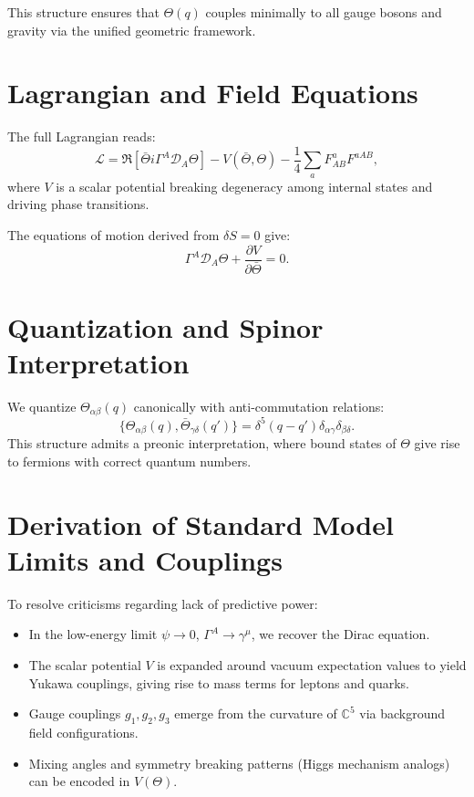 \documentclass[12pt]{article}
\begin{document}
This structure ensures that \( \Theta(q) \) couples minimally to all gauge bosons and gravity via the unified geometric framework.

\section{Lagrangian and Field Equations}
The full Lagrangian reads:
\[
\mathcal{L} = \Re \left[ \bar{\Theta} i \Gamma^A \mathcal{D}_A \Theta \right] - V(\bar{\Theta}, \Theta) - \frac{1}{4} \sum_a F^a_{AB} F^{aAB},
\]
where \( V \) is a scalar potential breaking degeneracy among internal states and driving phase transitions.

The equations of motion derived from \( \delta S = 0 \) give:
\[
\Gamma^A \mathcal{D}_A \Theta + \frac{\partial V}{\partial \bar{\Theta}} = 0.
\]

\section{Quantization and Spinor Interpretation}
We quantize \( \Theta_{\alpha\beta}(q) \) canonically with anti-commutation relations:
\[ \{ \Theta_{\alpha\beta}(q), \bar{\Theta}_{\gamma\delta}(q') \} = \delta^5(q-q') \delta_{\alpha\gamma} \delta_{\beta\delta}. \]
This structure admits a preonic interpretation, where bound states of \( \Theta \) give rise to fermions with correct quantum numbers.

\section{Derivation of Standard Model Limits and Couplings}
To resolve criticisms regarding lack of predictive power:

\begin{itemize}
  \item In the low-energy limit \( \psi \rightarrow 0 \), \( \Gamma^A \rightarrow \gamma^\mu \), we recover the Dirac equation.
  \item The scalar potential \( V \) is expanded around vacuum expectation values to yield Yukawa couplings, giving rise to mass terms for leptons and quarks.
  \item Gauge couplings \( g_1, g_2, g_3 \) emerge from the curvature of \( \mathbb{C}^5 \) via background field configurations.
  \item Mixing angles and symmetry breaking patterns (Higgs mechanism analogs) can be encoded in \( V(\Theta) \).
\end{itemize}
\end{document}
